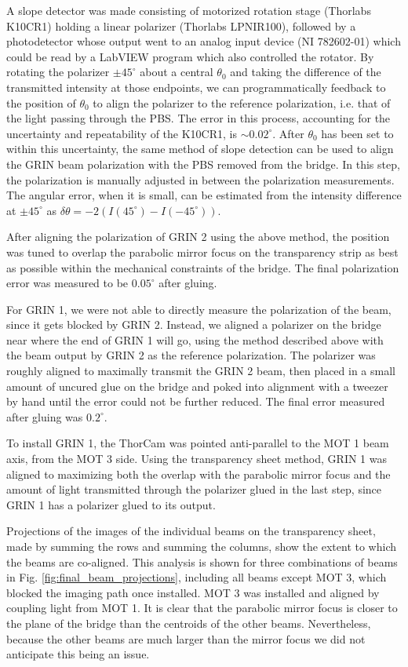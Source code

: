 A slope detector was made consisting of  motorized rotation stage (Thorlabs K10CR1) holding a linear polarizer (Thorlabs LPNIR100), followed by a photodetector whose output went to an analog input device (NI 782602-01) which could be read by a LabVIEW program which also controlled the rotator. By rotating the polarizer $\pm 45^{\circ}$ about a central $\theta_0$ and taking the difference of the transmitted intensity at those endpoints, we can programmatically feedback to the position of $\theta_0$ to align the polarizer to the reference polarization, i.e. that of the light passing through the PBS. The error in this process, accounting for the uncertainty and repeatability of the K10CR1, is $\sim 0.02^{\circ}$. After $\theta_0$ has been set to within this uncertainty, the same method of slope detection can be used to align the GRIN beam polarization with the PBS removed from the bridge. In this step, the polarization is manually adjusted in between the polarization measurements. The angular error, when it is small, can be estimated from the intensity difference at $\pm 45^{\circ}$ as $\delta \theta = -2(I(45^{\circ}) - I(-45^{\circ}))$. 

After aligning the polarization of GRIN 2 using the above method, the position was tuned to overlap the parabolic mirror focus on the transparency strip as best as possible within the mechanical constraints of the bridge. The final polarization error was measured to be $0.05^{\circ}$ after gluing.

For GRIN 1, we were not able to directly measure the polarization of the beam, since it gets blocked by GRIN 2. Instead, we aligned a polarizer on the bridge near where the end of GRIN 1 will go, using the method described above with the beam output by GRIN 2 as the reference polarization. The polarizer was roughly aligned to maximally transmit the GRIN 2 beam, then placed in a small amount of uncured glue on the bridge and poked into alignment with a tweezer by hand until the error could not be further reduced. The final error measured after gluing was $0.2^{\circ}$. 

To install GRIN 1, the ThorCam was pointed anti-parallel to the MOT 1 beam axis, from the MOT 3 side. Using the transparency sheet method, GRIN 1 was aligned to maximizing both the overlap with the parabolic mirror focus and the amount of light transmitted through the polarizer glued in the last step, since GRIN 1 has a polarizer glued to its output.

Projections of the images of the individual beams on the transparency sheet, made by summing the rows and summing the columns, show the extent to which the beams are co-aligned. This analysis is shown for three combinations of beams in Fig. \ref{fig:final_beam_projections}, including all beams except MOT 3, which blocked the imaging path once installed. MOT 3 was installed and aligned by coupling light from MOT 1. It is clear that the parabolic mirror focus is closer to the plane of the bridge than the centroids of the other beams. Nevertheless, because the other beams are much larger than the mirror focus we did not anticipate this being an issue. 

